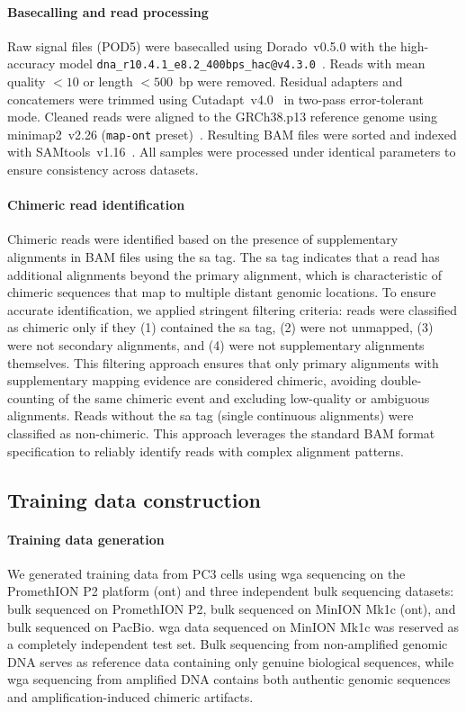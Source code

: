 \documentclass[pdflatex,sn-nature,lineno]{sn-jnl}%
\theoremstyle{thmstyleone}%
\theoremstyle{thmstyletwo}%
\theoremstyle{thmstylethree}%
\begin{document}
\paragraph{Basecalling and read processing}
Raw signal files (POD5) were basecalled using Dorado~v0.5.0 with the high-accuracy model \texttt{dna\_r10.4.1\_e8.2\_400bps\_hac@v4.3.0}~\cite{dorado2023}. Reads with mean quality $< 10$ or length $< 500$~bp were removed. Residual adapters and concatemers were trimmed using Cutadapt~v4.0~\cite{martin2011cutadapt} in two-pass error-tolerant mode. Cleaned reads were aligned to the GRCh38.p13 reference genome using minimap2~v2.26 (\texttt{map-ont} preset)~\cite{li2018minimap2}. Resulting BAM files were sorted and indexed with SAMtools~v1.16~\cite{danecek2021twelve}. All samples were processed under identical parameters to ensure consistency across datasets.

\paragraph{Chimeric read identification}
Chimeric reads were identified based on the presence of supplementary alignments in BAM files using the \gls{sa} tag.
The \gls{sa} tag indicates that a read has additional alignments beyond the primary alignment, which is characteristic of chimeric sequences that map to multiple distant genomic locations.
To ensure accurate identification, we applied stringent filtering criteria: reads were classified as chimeric only if they (1) contained the \gls{sa} tag, (2) were not unmapped, (3) were not secondary alignments, and (4) were not supplementary alignments themselves.
This filtering approach ensures that only primary alignments with supplementary mapping evidence are considered chimeric, avoiding double-counting of the same chimeric event and excluding low-quality or ambiguous alignments.
Reads without the \gls{sa} tag (single continuous alignments) were classified as non-chimeric.
This approach leverages the standard BAM format specification to reliably identify reads with complex alignment patterns.

\subsection*{Training data construction}

\paragraph{Training data generation}
We generated training data from PC3 cells using \gls{wga} sequencing on the PromethION P2 platform (\gls{ont}) and three independent bulk sequencing datasets: bulk sequenced on PromethION P2, bulk sequenced on MinION Mk1c (\gls{ont}), and bulk sequenced on PacBio.
\gls{wga} data sequenced on MinION Mk1c was reserved as a completely independent test set.
Bulk sequencing from non-amplified genomic DNA serves as reference data containing only genuine biological sequences, while \gls{wga} sequencing from amplified DNA contains both authentic genomic sequences and amplification-induced chimeric artifacts.
\end{document}
